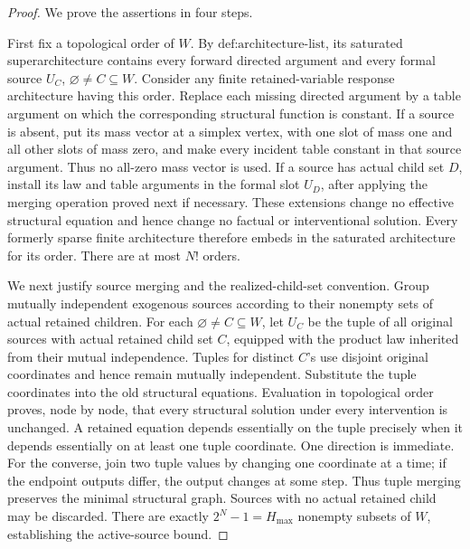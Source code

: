\documentclass{article}
\begin{document}
\begin{proof}
We prove the assertions in four steps.

First fix a topological order of \(W\).  By \(\text{def:architecture-list}\), its saturated superarchitecture contains every forward directed argument and every formal source \(U_C\), \(\varnothing\ne C\subseteq W\).  Consider any finite retained-variable response architecture having this order.  Replace each missing directed argument by a table argument on which the corresponding structural function is constant.  If a source is absent, put its mass vector at a simplex vertex, with one slot of mass one and all other slots of mass zero, and make every incident table constant in that source argument.  Thus no all-zero mass vector is used.  If a source has actual child set \(D\), install its law and table arguments in the formal slot \(U_D\), after applying the merging operation proved next if necessary.  These extensions change no effective structural equation and hence change no factual or interventional solution.  Every formerly sparse finite architecture therefore embeds in the saturated architecture for its order.  There are at most \(N!\) orders.

We next justify source merging and the realized-child-set convention.  Group mutually independent exogenous sources according to their nonempty sets of actual retained children.  For each \(\varnothing\ne C\subseteq W\), let \(U_C\) be the tuple of all original sources with actual retained child set \(C\), equipped with the product law inherited from their mutual independence.  Tuples for distinct \(C\)'s use disjoint original coordinates and hence remain mutually independent.  Substitute the tuple coordinates into the old structural equations.  Evaluation in topological order proves, node by node, that every structural solution under every intervention is unchanged.  A retained equation depends essentially on the tuple precisely when it depends essentially on at least one tuple coordinate.  One direction is immediate.  For the converse, join two tuple values by changing one coordinate at a time; if the endpoint outputs differ, the output changes at some step.  Thus tuple merging preserves the minimal structural graph.  Sources with no actual retained child may be discarded.  There are exactly \(2^N-1=H_{\max}\) nonempty subsets of \(W\), establishing the active-source bound.


\end{proof}
\end{document}
